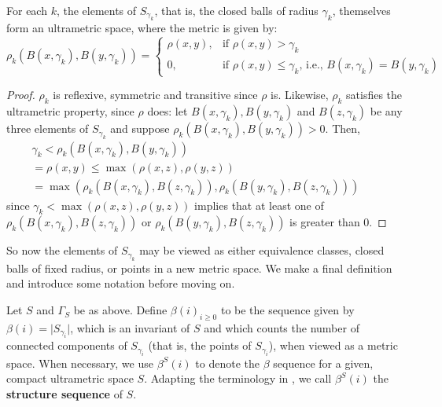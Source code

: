 \begin{lemma}
For each $k$, the elements of $S_{\gamma_k}$, that is, the closed balls of radius $\gamma_k$, themselves form an ultrametric space, where the metric is given by:
\[ \rho_k(B(x, \gamma_k),B(y, \gamma_k)) = 
\begin{cases}
\rho(x,y), & \text{if } \rho(x,y) > \gamma_k \\
0, & \text{if }   \rho(x,y) \leq \gamma_k \text{, i.e., } B(x, \gamma_k)=B(y, \gamma_k)
\end{cases}
\]
\end{lemma}

\begin{proof}
$\rho_k$ is reflexive, symmetric and transitive since $\rho$ is. Likewise, $\rho_k$ satisfies the ultrametric property, since $\rho$ does: let $B(x, \gamma_k),B(y, \gamma_k)$ and $B(z, \gamma_k)$ be any three elements of $S_{\gamma_k}$ and suppose $\rho_k(B(x, \gamma_k),B(y, \gamma_k)) > 0 $. Then,
\begin{align*}
\gamma_k < \rho_k(B(x, \gamma_k),B(y, \gamma_k)) && \\
= \rho(x,y) \leq \max(\rho(x,z), \rho(y,z)) && \\
= \max(\rho_k(B(x, \gamma_k), B(z, \gamma_k)), \rho_k(B(y, \gamma_k),B(z,\gamma_k)))
\end{align*}
since $ \gamma_k < \max(\rho(x,z), \rho(y,z))$ implies that at least one of $\rho_k(B(x, \gamma_k), B(z, \gamma_k))$ or $\rho_k(B(y, \gamma_k),B(z,\gamma_k))$ is greater than $0$.
\end{proof}

So now the elements of $S_{\gamma_k}$ may be viewed as either equivalence classes, closed balls of fixed radius, or points in a new metric space. We  make a final definition and introduce some notation before moving on.\\

\begin{definition}
Let $S$ and $\Gamma_S$ be as above. Define $\beta(i)_{i \geq 0}$ to be the sequence given by $\beta(i) = \lvert  S_{\gamma_i}\rvert$, which is an invariant of $S$ and which counts the number of connected components of $S_{\gamma_i}$ (that is, the points of $S_{\gamma_i}$), when viewed as a metric space. When necessary, we use $\beta^S(i)$ to denote the $\beta$ sequence for a given, compact  ultrametric space $S$. Adapting the terminology in \cite{fp}, we call $\beta^S(i)$ the \textbf{structure sequence} of $S$.
\end{definition}


